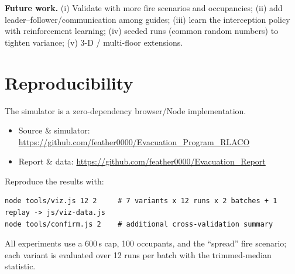 \documentclass[11pt,a4paper]{article}
\begin{document}
\textbf{Future work.} (i) Validate with more fire scenarios and occupancies; (ii) add
leader--follower/communication among guides; (iii) learn the interception policy with
reinforcement learning; (iv) seeded runs (common random numbers) to tighten variance; (v) 3-D /
multi-floor extensions.

\section{Reproducibility}

The simulator is a zero-dependency browser/Node implementation.
\begin{itemize}[leftmargin=1.4em,itemsep=2pt]
\item Source \& simulator: \url{https://github.com/feather0000/Evacuation_Program_RLACO}
\item Report \& data: \url{https://github.com/feather0000/Evacuation_Report}
\end{itemize}
Reproduce the results with:
\begin{verbatim}
node tools/viz.js 12 2     # 7 variants x 12 runs x 2 batches + 1 replay -> js/viz-data.js
node tools/confirm.js 2    # additional cross-validation summary
\end{verbatim}
All experiments use a 600\,s cap, 100 occupants, and the ``spread'' fire scenario; each variant is
evaluated over 12 runs per batch with the trimmed-median statistic.
\end{document}
